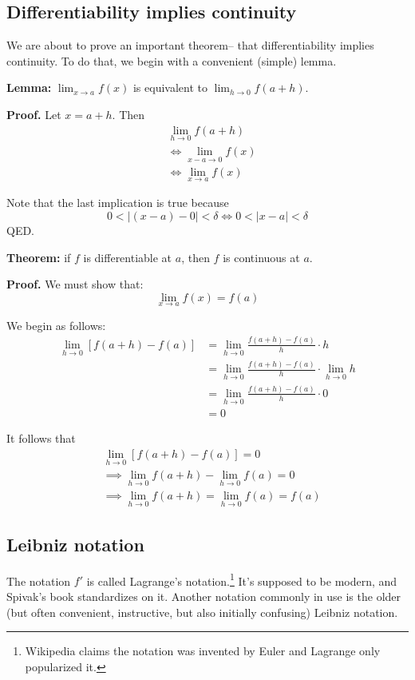 \subsection{Differentiability implies continuity}

We are about to prove an important theorem-- that differentiability
implies continuity. To do that, we begin with a convenient (simple)
lemma.

\vs

\textbf{Lemma:} $\lim_{x\to a}f(x)$ is equivalent to $\lim_{h\to
  0}f(a+h)$.

\textbf{Proof.} Let $x=a+h$. Then
\begin{align*}
  &\lim_{h\to0}f(a+h)\\
  &\iff\lim_{x-a\to0}f(x)\\
  &\iff\lim_{x\to a}f(x)
\end{align*}

Note that the last implication is true because
\[0<|(x-a)-0|<\delta\iff 0<|x-a|<\delta\]
QED.

\vs

\textbf{Theorem:} if $f$ is differentiable at $a$, then $f$ is
continuous at $a$.

\textbf{Proof.} We must show that:
\[\lim_{x\to a}f(x)=f(a)\]

We begin as follows:
\begin{align*}
  \lim_{h\to0}[f(a+h)-f(a)]&=\lim_{h\to0}\frac{f(a+h)-f(a)}{h}\cdot h\\
                         &=\lim_{h\to0}\frac{f(a+h)-f(a)}{h}\cdot \lim_{h\to
                           0}h\\
                         &=\lim_{h\to0}\frac{f(a+h)-f(a)}{h}\cdot 0\\
                         &=0
\end{align*}

It follows that
\begin{align*}
  &\lim_{h\to0}[f(a+h)-f(a)]=0\\
  &\implies \lim_{h\to0}f(a+h)-\lim_{h\to0}f(a)=0\\
  &\implies \lim_{h\to0}f(a+h)=\lim_{h\to0}f(a)=f(a)
\end{align*}

\subsection{Leibniz notation}

The notation $f'$ is called Lagrange's notation.\footnote{Wikipedia
  claims the notation was invented by Euler and Lagrange only
  popularized it.} It's supposed to be modern, and Spivak's book
standardizes on it. Another notation commonly in use is the older (but
often convenient, instructive, but also initially confusing) Leibniz
notation.

